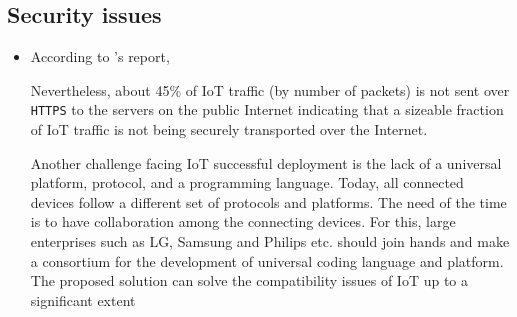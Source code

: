 \documentclass[10pt]{beamer}
\begin{document}
\subsection{Security issues}
\begin{frame}{}
\begin{itemize}

\item According to \citet{ITPAReport}'s report, 

\vspace{0.3cm}
\begin{quoting}[font=itshape, begintext={``}, endtext={''\cite[par.~IV.B]{ITPAReport}}]
Nevertheless, about 45\% of IoT traffic (by number of packets) is not sent over \texttt{HTTPS} to the servers on the public Internet indicating that a sizeable fraction of IoT traffic is not being securely transported over the Internet.
\end{quoting}
\vspace{0.3cm}

Another challenge facing IoT successful deployment is the
lack of a universal platform, protocol, and a programming
language. Today, all connected devices follow a different set
of protocols and platforms. The need of the time is to have
collaboration among the connecting devices. For this, large
enterprises such as LG, Samsung and Philips etc. should join
hands and make a consortium for the development of universal coding language and platform. The proposed solution
can solve the compatibility issues of IoT up to a significant
extent



\end{itemize}
\end{frame} 
\end{document}
